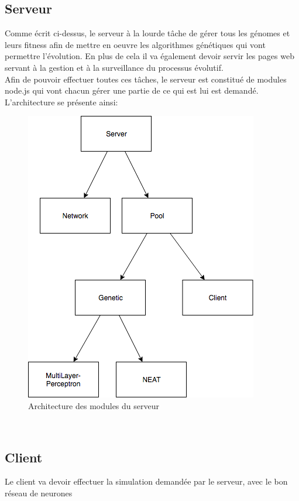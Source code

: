 \documentclass{article}
\begin{document}
\subsection{Serveur}

Comme écrit ci-dessus, le serveur à la lourde tâche de gérer tous les génomes et leurs fitness afin de mettre en oeuvre les algorithmes génétiques qui vont permettre l'évolution. En plus de cela il va également devoir servir les pages web servant à la gestion et à la surveillance du processus évolutif.\\
Afin de pouvoir effectuer toutes ces tâches, le serveur est constitué de modules node.js qui vont chacun gérer une partie de ce qui est lui est demandé.\\
L'architecture se présente ainsi:
\begin{figure}[h]
\begin{center}
	\includegraphics[scale=0.5]{"server.png"} 
	\caption{Architecture des modules du serveur}
\end{center}
\end{figure}\\

\subsection{Client}

Le client va devoir effectuer la simulation demandée par le serveur, avec le bon réseau de neurones
\end{document}
